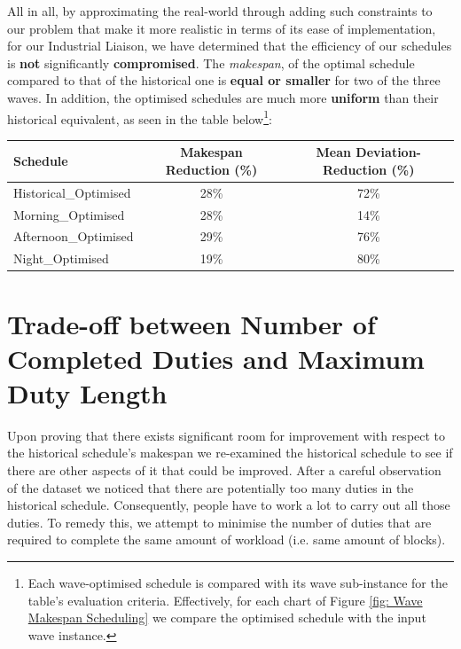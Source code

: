 \vspace{\baselineskip}
\noindent
All in all, by approximating the real-world through adding such constraints to our problem that make it more realistic in terms of its ease of implementation, for our Industrial Liaison, we have determined that the efficiency of our schedules is \textbf{not} significantly \textbf{compromised}. The \textit{makespan}, of the optimal schedule compared to that of the historical one is \textbf{equal or smaller} for two of the three waves. In addition, the optimised schedules are much more \textbf{uniform} than their historical equivalent, as seen in the table below\footnote{Each wave-optimised schedule is compared with its wave sub-instance for the table's evaluation criteria. Effectively, for each chart of Figure \ref{fig: Wave Makespan Scheduling} we compare the optimised schedule with the input wave instance.}:


\begin{table}[h]
\small
    \centering 
\begin{tabular}{l|c|c}
        \textbf{Schedule} & \textbf{Makespan Reduction (\%)} & Mean Deviation-\textbf{Reduction (\%)} \\
        \hline
         Historical\_Optimised & 28\% & 72\% \\
        \hline
         Morning\_Optimised  & 28\% & 14\% \\ 
         \hline
         Afternoon\_Optimised  & 29\% & 76\% \\ 
         \hline
         Night\_Optimised  & 19\% & 80\% \\ 
\end{tabular}
\end{table}

\section{Trade-off between Number of Completed Duties and Maximum Duty Length}
\label{section:minimise duties}
Upon proving that there exists significant room for improvement with respect to the historical schedule's makespan we re-examined the historical schedule to see if there are other aspects of it that could be improved. After a careful observation of the dataset we noticed that there are potentially too many duties in the historical schedule. Consequently, people have to work a lot to carry out all those duties. To remedy this, we attempt to minimise the number of duties that are required to complete the same amount of workload (i.e. same amount of blocks). 

